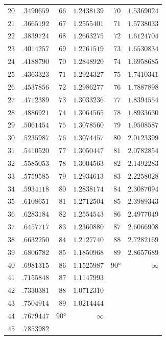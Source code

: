 \documentclass[12pt,a4paper]{article}
\theoremstyle{definition}
\begin{document}
\begin{center}
\begin{tabular}{r|r|r|r|r|r}
$20$ & $.3490659$ & $66$ & $1.2438139$ & $70$ & $1.5369024$ \\
$21$ & $.3665192$ & $67$ & $1.2555401$ & $71$ & $1.5738033$ \\
$22$ & $.3839724$ & $68$ & $1.2663275$ & $72$ & $1.6124704$ \\
$23$ & $.4014257$ & $69$ & $1.2761519$ & $73$ & $1.6530834$ \\
$24$ & $.4188790$ & $70$ & $1.2848920$ & $74$ & $1.6958685$ \\
$25$ & $.4363323$ & $71$ & $1.2924327$ & $75$ & $1.7410341$ \\
$26$ & $.4537856$ & $72$ & $1.2986277$ & $76$ & $1.7887898$ \\
$27$ & $.4712389$ & $73$ & $1.3033236$ & $77$ & $1.8394554$ \\
$28$ & $.4886921$ & $74$ & $1.3064565$ & $78$ & $1.8933630$ \\
$29$ & $.5061454$ & $75$ & $1.3078560$ & $79$ & $1.9508587$ \\
$30$ & $.5235987$ & $76$ & $1.3074457$ & $80$ & $2.0123399$ \\
$31$ & $.5410520$ & $77$ & $1.3050447$ & $81$ & $2.0782854$ \\
$32$ & $.5585053$ & $78$ & $1.3004563$ & $82$ & $2.1492283$ \\
$33$ & $.5759585$ & $79$ & $1.2934613$ & $83$ & $2.2258028$ \\
$34$ & $.5934118$ & $80$ & $1.2838174$ & $84$ & $2.3087094$ \\
$35$ & $.6108651$ & $81$ & $1.2712504$ & $85$ & $2.3989343$ \\
$36$ & $.6283184$ & $82$ & $1.2554543$ & $86$ & $2.4977049$ \\
$37$ & $.6457717$ & $83$ & $1.2360880$ & $87$ & $2.6066908$ \\
$38$ & $.6632250$ & $84$ & $1.2127740$ & $88$ & $2.7282169$ \\
$39$ & $.6806782$ & $85$ & $1.1850968$ & $89$ & $2.8657689$ \\
$40$ & $.6981315$ & $86$ & $1.1525987$ & $90°$ & $\infty$ \\
$41$ & $.7155848$ & $87$ & $1.1147993$ & & \\
$42$ & $.7330381$ & $88$ & $1.0712310$ & & \\
$43$ & $.7504914$ & $89$ & $1.0214444$ & & \\
$44$ & $.7679447$ & $90°$ & $\infty$ & & \\
$45$ & $.7853982$ & & & &
\end{tabular}
\end{center}
\end{document}

